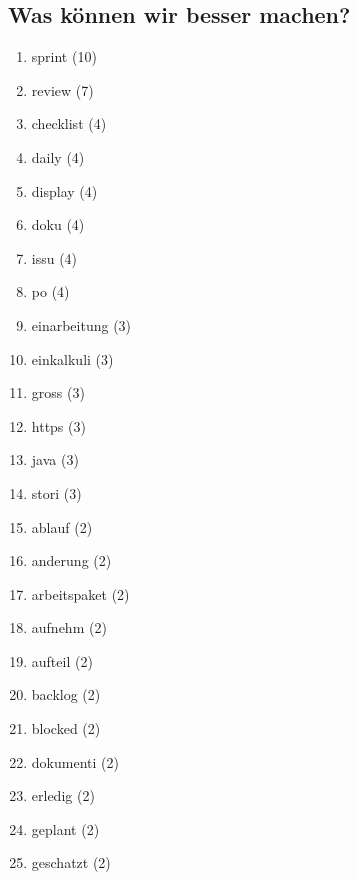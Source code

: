 \subsection*{Was können wir besser machen?}
\begin{enumerate}
    \item sprint (10)
    \item review (7)
    \item checklist (4)
    \item daily (4)
    \item display (4)
    \item doku (4)
    \item issu (4)
    \item po (4)
    \item einarbeitung (3)
    \item einkalkuli (3)
    \item gross (3)
    \item https (3)
    \item java (3)
    \item stori (3)
    \item ablauf (2)
    \item anderung (2)
    \item arbeitspaket (2)
    \item aufnehm (2)
    \item aufteil (2)
    \item backlog (2)
    \item blocked (2)
    \item dokumenti (2)
    \item erledig (2)
    \item geplant (2)
    \item geschatzt (2)
\end{enumerate}

